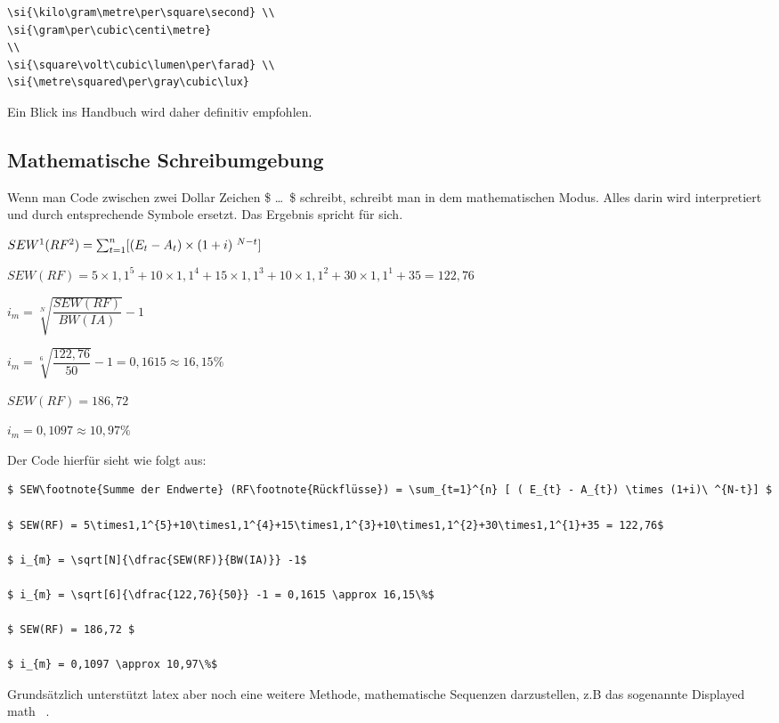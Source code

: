 \begin{lstlisting}[float=htpb,caption=Darstellungen von Einheiten mit siunitx,label=lst:einheiten]
\si{\kilo\gram\metre\per\square\second} \\
\si{\gram\per\cubic\centi\metre}
\\
\si{\square\volt\cubic\lumen\per\farad} \\
\si{\metre\squared\per\gray\cubic\lux}
\end{lstlisting}

Ein Blick ins Handbuch wird daher definitiv empfohlen.
\subsection{Mathematische Schreibumgebung}%
\label{sec:math-umg}
Wenn man Code zwischen zwei Dollar Zeichen \$ \dots\ \$ schreibt, schreibt man in dem mathematischen Modus. Alles darin wird interpretiert und durch entsprechende Symbole ersetzt. Das Ergebnis spricht für sich.

$ SEW\footnote{Summe der Endwerte} (RF\footnote{Rückflüsse}) = \sum_{t=1}^{n} [ ( E_{t} - A_{t}) \times (1+i)\ ^{N-t}] $

$ SEW(RF) = 5\times1,1^{5}+10\times1,1^{4}+15\times1,1^{3}+10\times1,1^{2}+30\times1,1^{1}+35 = 122,76$

$ i_{m} = \sqrt[N]{\dfrac{SEW(RF)}{BW(IA)}} -1$

$ i_{m} = \sqrt[6]{\dfrac{122,76}{50}} -1 = 0,1615 \approx 16,15\%$

$ SEW(RF) = 186,72 $

$ i_{m} = 0,1097 \approx 10,97\%$

Der Code hierfür sieht wie folgt aus:
\begin{lstlisting}[float=htpb,caption=Darstellungen von mathematischen Formeln,label=lst:inlinemath]
$ SEW\footnote{Summe der Endwerte} (RF\footnote{Rückflüsse}) = \sum_{t=1}^{n} [ ( E_{t} - A_{t}) \times (1+i)\ ^{N-t}] $

$ SEW(RF) = 5\times1,1^{5}+10\times1,1^{4}+15\times1,1^{3}+10\times1,1^{2}+30\times1,1^{1}+35 = 122,76$

$ i_{m} = \sqrt[N]{\dfrac{SEW(RF)}{BW(IA)}} -1$

$ i_{m} = \sqrt[6]{\dfrac{122,76}{50}} -1 = 0,1615 \approx 16,15\%$

$ SEW(RF) = 186,72 $

$ i_{m} = 0,1097 \approx 10,97\%$
\end{lstlisting}

Grundsätzlich unterstützt \gls{latex} aber noch eine weitere Methode, mathematische Sequenzen darzustellen, z.B das sogenannte \glqq Displayed math \grqq\ .

